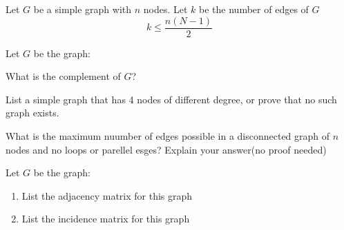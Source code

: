 \documentclass[10pt,letterpaper, cm]{hmcpset}
\date{May 2015}
\begin{document}
\begin{problem}[1]
  Let $G$ be a simple graph with $n$ nodes. Let $k$ be the number of edges of $G$
  \[
    k \leq \frac{n(N-1)}{2}
  \]
\end{problem}  

\begin{problem}[2]
  Let $G$ be the graph:
  \begin{center}  
\end{center}
  What is the complement of $G$?
\end{problem}


\begin{problem}[3]
List a simple graph that has 4 nodes of different degree, or prove that no such graph exists.
\end{problem}

\begin{problem}[4]
  What is the maximum nuumber of edges possible in a disconnected graph of $n$ nodes and no loops
  or parellel esges? Explain your answer(no proof needed)
\end{problem}


\begin{problem}[5]
  Let $G$ be the graph:
  \begin{center}
  \end{center}
  \begin{enumerate}
    \item List the adjacency matrix for this graph
    \item List the incidence matrix for this graph
  \end{enumerate}
\end{problem}
\end{document}
